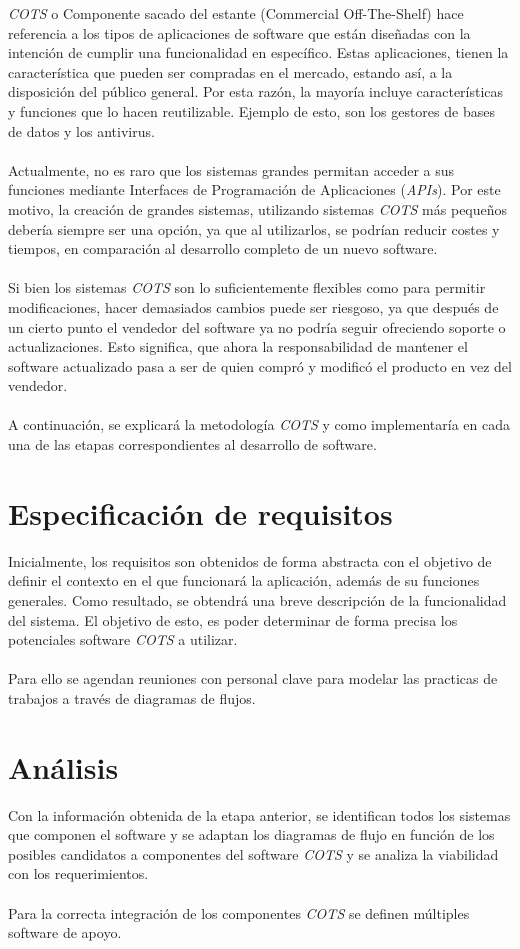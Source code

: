 \documentclass{udpreport}
\begin{document}
	\emph{COTS} o Componente sacado del estante (Commercial Off-The-Shelf) hace referencia a los tipos de aplicaciones de software que están diseñadas con la intención de cumplir una funcionalidad en específico. Estas aplicaciones, tienen la característica que pueden ser compradas en el mercado, estando así, a la disposición del público general. Por esta razón, la mayoría incluye características y funciones que lo hacen reutilizable. Ejemplo de esto, son los gestores de bases de datos y los antivirus.
	\\\\
	Actualmente, no es raro que los sistemas grandes permitan acceder a sus funciones mediante Interfaces de Programación de Aplicaciones (\emph{APIs}). Por este motivo, la creación de grandes sistemas, utilizando sistemas \emph{COTS} más pequeños debería siempre ser una opción, ya que al utilizarlos, se podrían reducir costes y tiempos, en comparación al desarrollo completo de un nuevo software.
	\\\\
	Si bien los sistemas \emph{COTS} son lo suficientemente flexibles como para permitir modificaciones, hacer demasiados cambios puede ser riesgoso, ya que después de un cierto punto el vendedor del software ya no podría seguir ofreciendo soporte o actualizaciones. Esto significa, que ahora la responsabilidad de mantener el software actualizado pasa a ser de quien compró y modificó el producto en vez del vendedor.
	\\\\
	A continuación, se explicará la metodología \emph{COTS} y como implementaría en cada una de las etapas correspondientes al desarrollo de software.
	\section{Especificación de requisitos}
        Inicialmente, los requisitos son obtenidos de forma abstracta con el objetivo de definir el contexto en el que funcionará la aplicación, además de su funciones generales. Como resultado, se obtendrá una breve descripción de la funcionalidad del sistema. El objetivo de esto, es poder determinar de forma precisa los potenciales software \emph{COTS} a utilizar.\\\\
        Para ello se agendan reuniones con personal clave para modelar las practicas de trabajos a través de diagramas de flujos.
	\section{Análisis}
	    Con la información obtenida de la etapa anterior, se identifican todos los sistemas que componen el software y se adaptan los diagramas de flujo en función de los posibles candidatos a componentes del software \emph{COTS} y se analiza la viabilidad con los requerimientos. \\\\
	    Para la correcta integración de los componentes \emph{COTS} se definen múltiples software de apoyo.     
	\newpage
\end{document}
